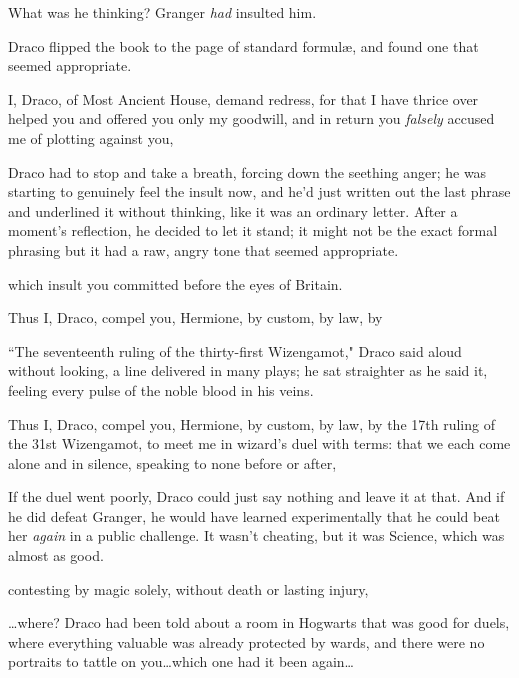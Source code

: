 What was he thinking? Granger \emph{had} insulted him.

Draco flipped the book to the page of standard formulæ, and found one that seemed appropriate.

\begin{writtenNote}
I, Draco, of Most Ancient House, demand redress, for that I have thrice over helped you and offered you only my goodwill, and in return you \emph{falsely} accused me of plotting against you,
\end{writtenNote}

Draco had to stop and take a breath, forcing down the seething anger; he was starting to genuinely feel the insult now, and he'd just written out the last phrase and underlined it without thinking, like it was an ordinary letter. After a moment's reflection, he decided to let it stand; it might not be the exact formal phrasing but it had a raw, angry tone that seemed appropriate.

\begin{writtenNote}
which insult you committed before the eyes of Britain.

Thus I, Draco, compel you, Hermione, by custom, by law, by
\end{writtenNote}

``The seventeenth ruling of the thirty-first Wizengamot," Draco said aloud without looking, a line delivered in many plays; he sat straighter as he said it, feeling every pulse of the noble blood in his veins.

\begin{writtenNote}
Thus I, Draco, compel you, Hermione, by custom, by law, by the 17th ruling of the 31st Wizengamot, to meet me in wizard's duel with terms: that we each come alone and in silence, speaking to none before or after,
\end{writtenNote}

If the duel went poorly, Draco could just say nothing and leave it at that. And if he did defeat Granger, he would have learned experimentally that he could beat her \emph{again} in a public challenge. It wasn't cheating, but it was Science, which was almost as good.

\begin{writtenNote}
contesting by magic solely, without death or lasting injury,
\end{writtenNote}

…where? Draco had been told about a room in Hogwarts that was good for duels, where everything valuable was already protected by wards, and there were no portraits to tattle on you…which one had it been again…


